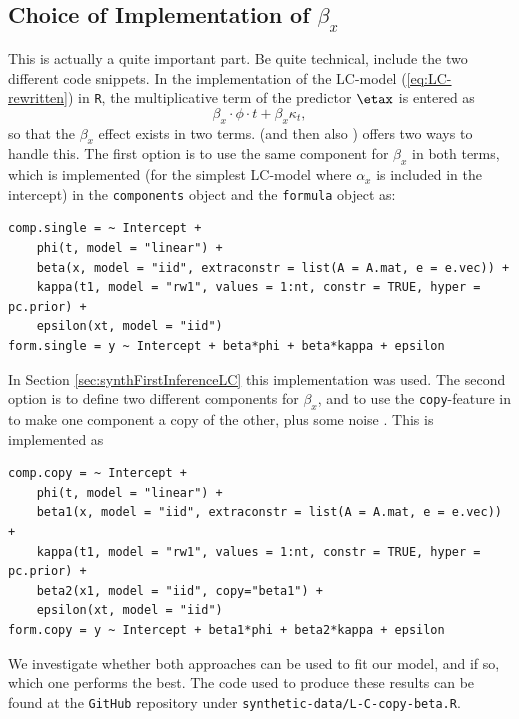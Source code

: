 \subsection{Choice of Implementation of $\beta_x$}
\textcolor{myDarkGreen}{This is actually a quite important part. Be quite technical, include the two different code snippets. }
In the implementation of the LC-model (\ref{eq:LC-rewritten}) in \texttt{R}, the multiplicative term of the predictor $\etax$ is entered as
\begin{equation}
    \beta_x\cdot\phi \cdot t + \beta_x\kappa_t,
\end{equation}
so that the $\beta_x$ effect exists in two terms. \inla (and then also \inlabru) offers two ways to handle this. The first option is to use the same component for $\beta_x$ in both terms, which is implemented (for the simplest LC-model where $\alpha_x$ is included in the intercept) in the \texttt{components} object and the \texttt{formula} object as:
\begin{verbatim}
comp.single = ~ Intercept + 
    phi(t, model = "linear") + 
    beta(x, model = "iid", extraconstr = list(A = A.mat, e = e.vec)) + 
    kappa(t1, model = "rw1", values = 1:nt, constr = TRUE, hyper = pc.prior) + 
    epsilon(xt, model = "iid")
form.single = y ~ Intercept + beta*phi + beta*kappa + epsilon
\end{verbatim}
In Section \ref{sec:synthFirstInferenceLC} this implementation was used. The second option is to define two different components for $\beta_x$, and to use the \texttt{copy}-feature in \inla to make one component a copy of the other, plus some noise \cite{MARTINS201368}. This is implemented as
\begin{verbatim}
comp.copy = ~ Intercept + 
    phi(t, model = "linear") + 
    beta1(x, model = "iid", extraconstr = list(A = A.mat, e = e.vec)) + 
    kappa(t1, model = "rw1", values = 1:nt, constr = TRUE, hyper = pc.prior) + 
    beta2(x1, model = "iid", copy="beta1") +
    epsilon(xt, model = "iid")
form.copy = y ~ Intercept + beta1*phi + beta2*kappa + epsilon
\end{verbatim}
We investigate whether both approaches can be used to fit our model, and if so, which one performs the best. The code used to produce these results can be found at the \texttt{GitHub} repository under \texttt{synthetic-data/L-C-copy-beta.R}. 

